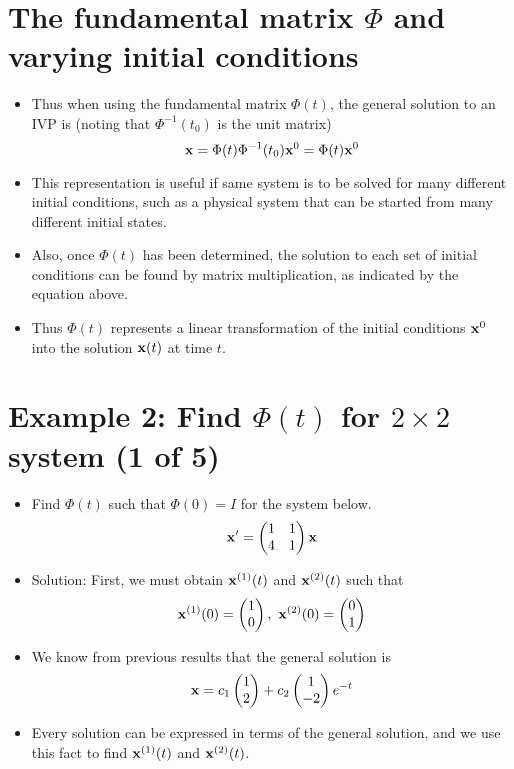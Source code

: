 \documentclass[11pt,a4paper]{article}
\begin{document}
	\section*{The fundamental matrix $\Phi$ and varying initial conditions}
	\begin{itemize}
		\item Thus when using the fundamental matrix $\Phi(t)$, the general solution to an IVP is (noting that $\Phi^{-1}(t_0)$ is the unit matrix)
		$$
		\vb{x} = \Phi(t)\Phi^{-1}(t_0)\vb{x}^0 = \Phi(t)\vb{x}^0
		$$
		\item This representation is useful if same system is to be solved for many different initial conditions, such as a physical system that can be started from many different initial states.
		\item Also, once $\Phi(t)$ has been determined, the solution to each set of initial conditions can be found by matrix multiplication, as indicated by the equation above.
		\item Thus $\Phi(t)$ represents a linear transformation of the initial conditions $\vb{x}^0$ into the solution $\vb{x}(t)$ at time $t$.
	\end{itemize}
	\section*{Example 2: Find $\Phi(t)$ for $2 \times 2$ system (1 of 5)}
	\begin{itemize}
		\item Find $\Phi(t)$ such that $\Phi(0) = I$ for the system below.
		$$
		\vb{x}^\prime = 
		\begin{pmatrix}
			1 & 1\\
			4 & 1
		\end{pmatrix}\vb{x}
		$$
		\item Solution: First, we must obtain $\vb{x}^{(1)}(t)$ and $\vb{x}^{(2)}(t)$ such that
		$$
		\vb{x}^{(1)}(0) = 
		\begin{pmatrix}
			1\\
			0
		\end{pmatrix},\ 
		\vb{x}^{(2)}(0) =
		\begin{pmatrix}
			0\\
			1
		\end{pmatrix}
		$$
		\item We know from previous results that the general solution is
		$$
		\vb{x} = c_1
		\begin{pmatrix}
			1\\
			2
		\end{pmatrix} + c_2
		\begin{pmatrix}
			1\\
			-2
		\end{pmatrix}e^{-t}
		$$
		\item Every solution can be expressed in terms of the general solution, and we use this fact to find $\vb{x}^{(1)}(t)$ and $\vb{x}^{(2)}(t)$.
	\end{itemize}
\end{document}

